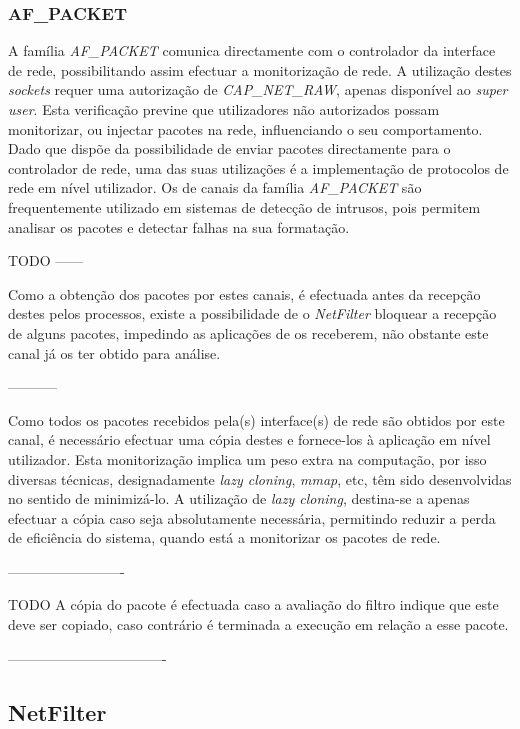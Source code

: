 \subsubsection{AF\_PACKET}
\label{subsub:af_packet}

A família \textit{AF\_PACKET} comunica directamente com o controlador da interface de rede, possibilitando assim efectuar a monitorização de rede.
A utilização destes \textit{sockets} requer uma autorização de \textit{CAP\_NET\_RAW}, apenas disponível ao \textit{super user}.
Esta verificação previne que utilizadores não autorizados possam monitorizar, ou injectar pacotes na rede, influenciando o seu comportamento.
Dado que dispõe da possibilidade de enviar pacotes directamente para o controlador de rede, uma das suas utilizações é a implementação de protocolos de rede em nível utilizador.
Os de canais da família \textit{AF\_PACKET} são frequentemente utilizado em sistemas de detecção de intrusos, pois permitem analisar os pacotes e detectar falhas na sua formatação.

TODO ------

Como a obtenção dos pacotes por estes canais, é efectuada antes da recepção destes pelos processos, existe a possibilidade de o \textit{NetFilter} bloquear a recepção de alguns pacotes, impedindo as aplicações de os receberem, não obstante este canal já os ter obtido para análise.

-----------

Como todos os pacotes recebidos pela(s) interface(s) de rede são obtidos por este canal, é necessário efectuar uma cópia destes e fornece-los à aplicação em nível utilizador.
Esta monitorização implica um peso extra na computação, por isso diversas técnicas, designadamente \textit{lazy cloning}, \textit{mmap}, etc, têm sido desenvolvidas no sentido de minimizá-lo.
A utilização de \textit{lazy cloning}, destina-se a apenas efectuar a cópia caso seja absolutamente necessária, permitindo reduzir a perda de eficiência do sistema, quando está a monitorizar os pacotes de rede.

-------------------------

TODO
A cópia do pacote é efectuada caso a avaliação do filtro indique que este deve ser copiado, caso contrário é terminada a execução em relação a esse pacote.

----------------------------------

\subsection{NetFilter}


